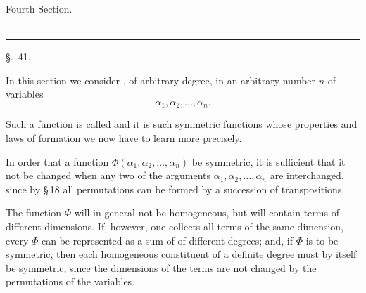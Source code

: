 
\begin{center}
{\Large Fourth Section.}\\[0.8em]
{\Large{}}\\[0.8em]
\rule{0.16\textwidth}{0.4pt}
\end{center}

\begin{center}
{\large \S.\ 41.}

\vspace{0.5em}
{\large{}}

{\large{}}
\end{center}

In this section we consider , of arbitrary degree, in an arbitrary number $n$ of variables
\[
 \alpha_1,\alpha_2,\ldots,\alpha_n.
\]

Such a function is called   and it is such symmetric functions whose properties and laws of formation we now have to learn more precisely.

In order that a function $\Phi(\alpha_1,\alpha_2,\ldots,\alpha_n)$ be symmetric, it is sufficient that it not be changed when any two of the arguments $\alpha_1,\alpha_2,\ldots,\alpha_n$ are interchanged, since by \S\,18 all permutations can be formed by a succession of transpositions.

The function $\Phi$ will in general not be homogeneous, but will contain terms of different dimensions. If, however, one collects all terms of the same dimension, every $\Phi$ can be represented as a sum of  of different degrees; and, if $\Phi$ is to be symmetric, then each homogeneous constituent of a definite degree must by itself be symmetric, since the dimensions of the terms are not changed by the permutations of the variables.
